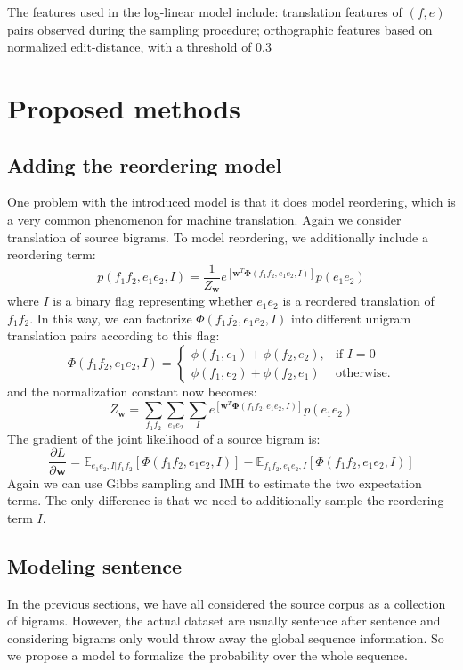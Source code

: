 The features used in the log-linear model include: translation features of $(f, e)$ pairs observed during the sampling procedure; orthographic features based on normalized edit-distance, with a threshold of 0.3

\section{Proposed methods}
\subsection{Adding the reordering model}
One problem with the introduced model is that it does model reordering, which is a very common phenomenon for machine translation. 
Again we consider translation of source bigrams.
To model reordering, we additionally include a reordering term:
\begin{equation}
p(f_1 f_2, e_1 e_2, I) = \frac{1}{Z_{\mathbf{w}}}  e^{\left[ \mathbf{w}^T\mathbf{\Phi}(f_1f_2, e_1e_2, I) \right]} p(e_1e_2)
\end{equation}
where $I$ is a binary flag representing whether $e_1e_2$ is a reordered translation
of $f_1f_2$. In this way, we can factorize $\Phi(f_1f_2, e_1e_2, I)$ into different unigram translation pairs according to this flag:
\[
    \Phi(f_1f_2, e_1e_2, I) = 
\begin{cases}
     \phi(f_1, e_1)+\phi(f_2,e_2) ,& \text{if } I = 0\\
    \phi(f_1, e_2)+\phi(f_2, e_1)              & \text{otherwise}.
\end{cases}
\]
and the normalization constant now becomes:
\begin{equation}
{Z_{\mathbf{w}}} = \sum_{f_1f_2}\sum_{e_1e_2}\sum_I e^{\left[ \mathbf{w}^T\mathbf{\Phi}(f_1f_2, e_1e_2, I) \right]} p(e_1e_2)
\end{equation}
The gradient of the joint likelihood of a source bigram is:
\begin{equation}
\frac{\partial L}{\partial \mathbf{w}} = \mathbb{E}_{e_1e_2, I|f_1f_2}[\Phi(f_1f_2,e_1e_2, I)] - \mathbb{E}_{f_1f_2,e_1e_2, I}[\Phi(f_1f_2,e_1e_2,I)]
\end{equation}
Again we can use Gibbs sampling and IMH to estimate the two expectation terms. The only difference is that
we need to additionally sample the reordering term $I$.
\subsection{Modeling sentence}
In the previous sections, we have all considered the source corpus as a collection of
bigrams. However, the actual dataset are usually sentence after sentence and considering bigrams only would throw away the 
global sequence information. So we propose a model to formalize the probability over the whole sequence.


